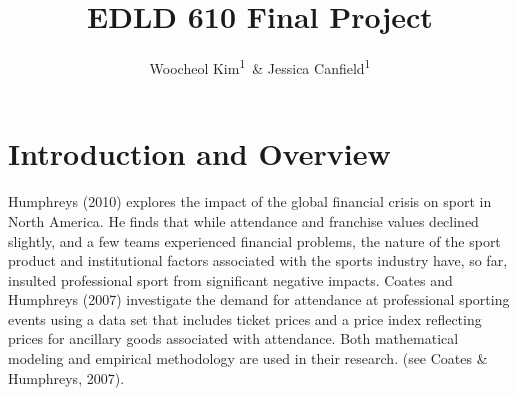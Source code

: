 \documentclass[man, fleqn, noextraspace,floatsintext]{apa6}
\title{EDLD 610 Final Project}
\author{Woocheol Kim\textsuperscript{1}~\& Jessica Canfield\textsuperscript{1}}
\date{}
\affiliation{
\vspace{0.5cm}
\textsuperscript{1} University of Oregon}
\begin{document}
\maketitle

\hypertarget{introduction-and-overview}{%
\section{Introduction and Overview}\label{introduction-and-overview}}

Humphreys (2010) explores the impact of the global financial crisis on sport in North America. He finds that while attendance and franchise values declined slightly, and a few teams experienced financial problems, the nature of the sport product and institutional factors associated with the sports industry have, so far, insulted professional sport from significant negative impacts. Coates and Humphreys (2007) investigate the demand for attendance at professional sporting events using a data set that includes ticket prices and a price index reflecting prices for ancillary goods associated with attendance. Both mathematical modeling and empirical methodology are used in their research. (see Coates \& Humphreys, 2007).
\end{document}
